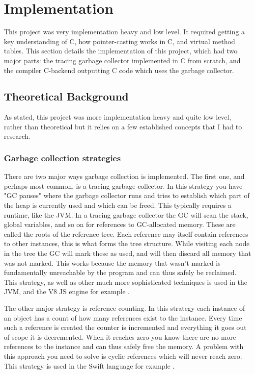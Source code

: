 \section{Implementation}
This project was very implementation heavy and low level. It required getting a key understanding of C, how pointer-casting works in C, and virtual method tables. This section details the implementation of this project, which had two major parts: the tracing garbage collector implemented in C from scratch, and the compiler C-backend outputting C code which uses the garbage collector.

\subsection{Theoretical Background}
As stated, this project was more implementation heavy and quite low level, rather than theoretical but it relies on a few established concepts that I had to research.

\subsubsection{Garbage collection strategies}
There are two major ways garbage collection is implemented. The first one, and perhaps most common, is a tracing garbage collector. In this strategy you have "GC pauses" where the garbage collector runs and tries to establish which part of the heap is currently used and which can be freed. This typically requires a runtime, like the JVM. In a tracing garbage collector the GC will scan the stack, global variables, and so on for references to GC-allocated memory. These are called the roots of the reference tree. Each reference may itself contain references to other instances, this is what forms the tree structure. While visiting each node in the tree the GC will mark these as used, and will then discard all memory that was not marked. This works because the memory that wasn't marked is fundamentally unreachable by the program and can thus safely be reclaimed. This strategy, as well as other much more sophisticated techniques is used in the JVM, and the V8 JS engine for example \cite{v8-gc}.

The other major strategy is reference counting. In this strategy each instance of an object has a count of how many references exist to the instance. Every time such a reference is created the counter is incremented and everything it goes out of scope it is decremented. When it reaches zero you know there are no more references to the instance and can thus safely free the memory. A problem with this approach you need to solve is cyclic references which will never reach zero. This strategy is used in the Swift language for example \cite{swift-arc}.

